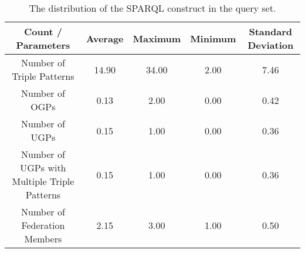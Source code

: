 \begin{table}
    \begin{center}
        \begin{tabular}{|*{5}{c|}}
        \hline
        Count / Parameters & Average & Maximum & Minimum & Standard Deviation \\ 
        \hline \hline
        Number of Triple Patterns & 14.90 & 34.00 & 2.00 & 7.46 \\ 
        \hline
        Number of OGPs & 0.13 & 2.00 & 0.00 & 0.42 \\ 
        \hline
        Number of UGPs & 0.15 & 1.00 & 0.00 & 0.36 \\ 
        \hline
        Number of UGPs with Multiple Triple Patterns & 0.15 & 1.00 & 0.00 & 0.36 \\ 
        \hline
        Number of Federation Members & 2.15 & 3.00 & 1.00 & 0.50 \\  
        \hline
        \end{tabular}
    \end{center}
    \caption{
        The distribution of the SPARQL construct in the query set.
    }
    \label{tab:statQuery}
\end{table}